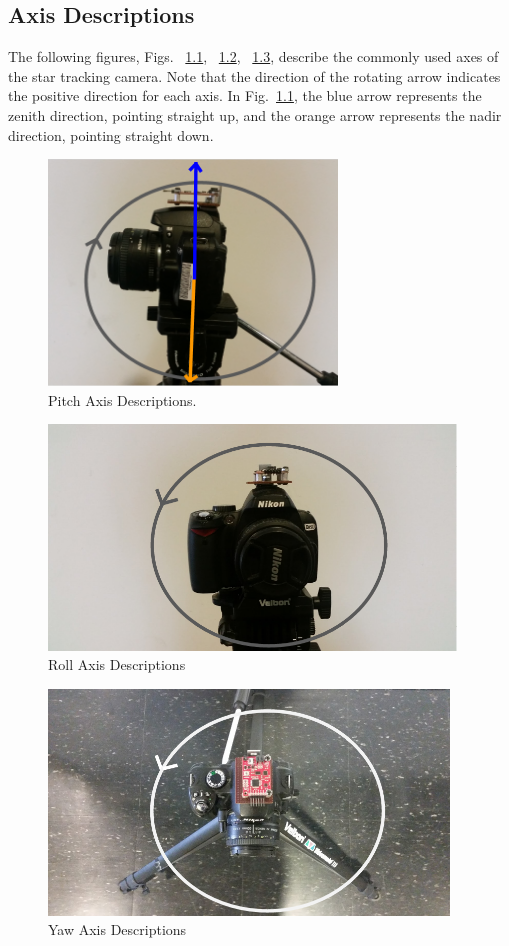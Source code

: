 \documentclass[12pt,a4paper]{book}
\begin{document}
\begin{appendices}
\chapter{Axis Descriptions}
The following figures, Figs. ~\ref{f:pitchaxis}, ~\ref{f:rollaxis}, ~\ref{f:yawaxis}, describe the commonly used axes of the star tracking camera.  Note that the direction of the rotating arrow indicates the positive direction for each axis.  In Fig.~\ref{f:pitchaxis}, the blue arrow represents the zenith direction, pointing straight up, and the orange arrow represents the nadir direction, pointing straight down.  
\begin{figure}[!ht]
\centering
\includegraphics[height=6cm]{pitch.png}
\caption{Pitch Axis Descriptions.}\label{f:pitchaxis}
\end{figure}

\begin{figure}[!ht]
\centering
\includegraphics[height=6cm]{roll.png}
\caption{Roll Axis Descriptions}\label{f:rollaxis}
\end{figure}

\begin{figure}[!ht]
\centering
\includegraphics[height=6cm]{yaw.png}
\caption{Yaw Axis Descriptions}\label{f:yawaxis}
\end{figure}


\end{appendices}
\end{document}
